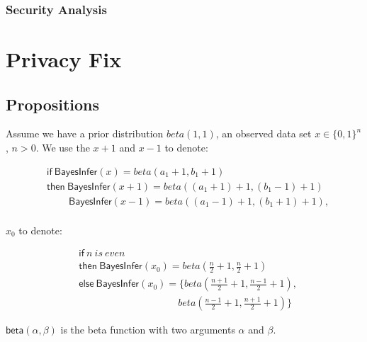 \documentclass{article}
\begin{document}
\subsubsection{Security Analysis}


\section{Privacy Fix}

\subsection{Propositions}
Assume we have a prior distribution $beta(1,1)$, an observed data set $x \in \{0,1\}^n$, $n>0$. We use the $x+1$ and $x-1$ to denote:
\begin{small}
\begin{equation*}
\begin{split}
&\mathsf{if\ BayesInfer}(x) = beta(a_1 + 1,b_1 + 1)\\
&\mathsf{then}\mathsf{\ BayesInfer}(x + 1) = beta((a_1 + 1) +1, (b_1 - 1)+1)\\
&\quad \quad \mathsf{\ BayesInfer}(x - 1) = beta((a_1 - 1) +1, (b_1 + 1)+1),\\
\end{split}
\end{equation*}
\end{small}

$x_0$ to denote:
\begin{small}
\begin{equation*}
\begin{split}
&\mathsf{if}\ n\ is\ even\\
&\mathsf{then}\ \mathsf{BayesInfer}(x_0) = beta(\frac{n}{2} + 1, \frac{n}{2} + 1)\\
&\mathsf{else}\ \mathsf{BayesInfer}(x_0) = \{beta(\frac{n+1}{2} + 1, \frac{n-1}{2} + 1),\\
&\quad \quad \quad \quad \quad \quad \quad \quad \quad \quad beta(\frac{n - 1}{2} + 1, \frac{n + 1}{2} + 1)\}
\end{split}
\end{equation*}
\end{small}

$\mathsf{beta}(\alpha, \beta)$ is the beta function with two arguments $\alpha$ and $\beta$.
\end{document}

